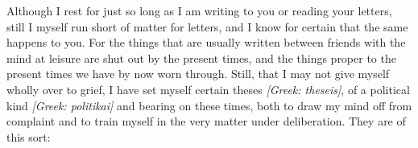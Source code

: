 

 Although I rest for just so long as I am writing to you or reading your letters, still I myself run short of matter for letters, and I know for certain that the same happens to you. For the things that are usually written between friends with the mind at leisure are shut out by the present times, and the things proper to the present times we have by now worn through. Still, that I may not give myself wholly over to grief, I have set myself certain theses \textit{[Greek: theseis]}, of a political kind \textit{[Greek: politikai]} and bearing on these times, both to draw my mind off from complaint and to train myself in the very matter under deliberation. They are of this sort:

